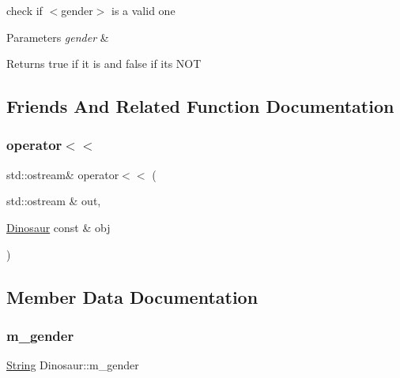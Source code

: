 check if $<$gender$>$ is a valid one 
\begin{DoxyParams}{Parameters}
{\em gender} & \\
\hline
\end{DoxyParams}
\begin{DoxyReturn}{Returns}
true if it is and false if it\textquotesingle{}s N\+OT 
\end{DoxyReturn}


\subsection{Friends And Related Function Documentation}
\mbox{\label{classDinosaur_ab91168c044595ffe09ebf71e598517ca}} 
\subsubsection{\texorpdfstring{operator$<$$<$}{operator<<}}
{\footnotesize\ttfamily std\+::ostream\& operator$<$$<$ (\begin{DoxyParamCaption}\item[{std\+::ostream \&}]{out,  }\item[{\hyperlink{classDinosaur}{Dinosaur} const \&}]{obj }\end{DoxyParamCaption})\hspace{0.3cm}{\ttfamily [friend]}}



\subsection{Member Data Documentation}
\mbox{\label{classDinosaur_a62c9e910de13f41b3c536d1f05360e88}} 
\subsubsection{\texorpdfstring{m\+\_\+gender}{m\_gender}}
{\footnotesize\ttfamily \hyperlink{classString}{String} Dinosaur\+::m\+\_\+gender\hspace{0.3cm}{\ttfamily [private]}}

\mbox{\label{classDinosaur_a831287eff2c7e12fb223bc417a03a28b}} 
